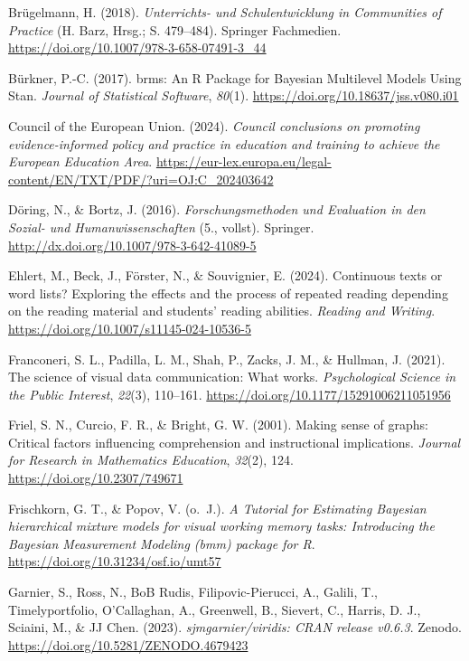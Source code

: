 \documentclass[
  jou,
  floatsintext,
  longtable,
  nolmodern,
  notxfonts,
  notimes,
  colorlinks=true,linkcolor=blue,citecolor=blue,urlcolor=blue]{apa7}
\newlength{\cslhangindent}
\newenvironment{CSLReferences}[2] %
 {\begin{list}{}{%
  \setlength{\itemindent}{0pt}
  \setlength{\leftmargin}{0pt}
  \setlength{\parsep}{0pt}
  \ifodd #1
   \setlength{\leftmargin}{\cslhangindent}
   \setlength{\itemindent}{-1\cslhangindent}
  \fi
  \setlength{\itemsep}{#2\baselineskip}}}
 {\end{list}}
\begin{document}
\begin{CSLReferences}{1}{0}
Brügelmann, H. (2018). \emph{Unterrichts- und Schulentwicklung in
Communities of Practice} (H. Barz, Hrsg.; S. 479--484). Springer
Fachmedien. \url{https://doi.org/10.1007/978-3-658-07491-3_44}

Bürkner, P.-C. (2017). brms: An R Package for Bayesian Multilevel Models
Using Stan. \emph{Journal of Statistical Software}, \emph{80}(1).
\url{https://doi.org/10.18637/jss.v080.i01}

Council of the European Union. (2024). \emph{Council conclusions on
promoting evidence-informed policy and practice in education and
training to achieve the European Education Area}.
\url{https://eur-lex.europa.eu/legal-content/EN/TXT/PDF/?uri=OJ:C_202403642}

Döring, N., \& Bortz, J. (2016). \emph{Forschungsmethoden und Evaluation
in den Sozial- und Humanwissenschaften} (5., vollst). Springer.
\url{http://dx.doi.org/10.1007/978-3-642-41089-5}

Ehlert, M., Beck, J., Förster, N., \& Souvignier, E. (2024). Continuous
texts or word lists? Exploring the effects and the process of repeated
reading depending on the reading material and students{'} reading
abilities. \emph{Reading and Writing}.
\url{https://doi.org/10.1007/s11145-024-10536-5}

Franconeri, S. L., Padilla, L. M., Shah, P., Zacks, J. M., \& Hullman,
J. (2021). The science of visual data communication: What works.
\emph{Psychological Science in the Public Interest}, \emph{22}(3),
110--161. \url{https://doi.org/10.1177/15291006211051956}

Friel, S. N., Curcio, F. R., \& Bright, G. W. (2001). Making sense of
graphs: Critical factors influencing comprehension and instructional
implications. \emph{Journal for Research in Mathematics Education},
\emph{32}(2), 124. \url{https://doi.org/10.2307/749671}

Frischkorn, G. T., \& Popov, V. (o.~J.). \emph{A Tutorial for Estimating
Bayesian hierarchical mixture models for visual working memory tasks:
Introducing the Bayesian Measurement Modeling (bmm) package for R}.
\url{https://doi.org/10.31234/osf.io/umt57}

Garnier, S., Ross, N., BoB Rudis, Filipovic-Pierucci, A., Galili, T.,
Timelyportfolio, O'Callaghan, A., Greenwell, B., Sievert, C., Harris, D.
J., Sciaini, M., \& JJ Chen. (2023). \emph{sjmgarnier/viridis: CRAN
release v0.6.3}. Zenodo. \url{https://doi.org/10.5281/ZENODO.4679423}


\end{CSLReferences}
\end{document}
